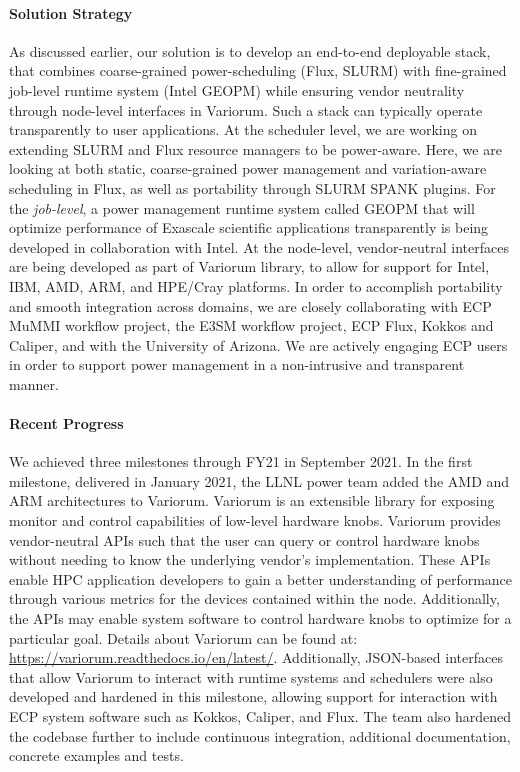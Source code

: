 \paragraph{Solution Strategy}
As discussed earlier, our solution is to develop an end-to-end deployable stack, that combines coarse-grained power-scheduling (Flux, SLURM) with fine-grained job-level runtime system (Intel GEOPM) while ensuring vendor neutrality through node-level interfaces in Variorum. Such a stack can typically operate transparently to user applications. At the scheduler level, we are working on extending SLURM and Flux resource managers to be power-aware. Here, we are looking at both static, coarse-grained power management and variation-aware scheduling in Flux, as well as portability through SLURM SPANK plugins. For the \emph{job-level}, a power management runtime system called GEOPM that will optimize performance of Exascale scientific applications transparently is being developed in collaboration with Intel. At the node-level, vendor-neutral interfaces are being developed as part of Variorum library, to allow for support for Intel, IBM, AMD, ARM, and HPE/Cray platforms. In order to accomplish portability and smooth integration across domains, we are closely collaborating with ECP MuMMI workflow project, the E3SM workflow project, ECP Flux, Kokkos and Caliper, and with the University of Arizona. We are actively engaging ECP users in order to support power management in a non-intrusive and transparent manner. 

\paragraph{Recent Progress}
We achieved three milestones through FY21 in September 2021. In the first milestone, delivered in January 2021, the LLNL power team added the AMD and ARM architectures to Variorum. Variorum is an extensible library for exposing monitor and control capabilities of low-level hardware knobs. Variorum provides vendor-neutral APIs such that the user can query or control hardware knobs without needing to know the underlying vendor’s implementation. These APIs enable HPC application developers to gain a better understanding of performance through various metrics for the devices contained within the node. Additionally, the APIs may enable system software to control hardware knobs to optimize for a particular goal. Details about Variorum can be found at: \url{https://variorum.readthedocs.io/en/latest/}. Additionally, JSON-based interfaces that allow Variorum to interact with runtime systems and schedulers were also developed and hardened in this milestone, allowing support for interaction with ECP system software such as Kokkos, Caliper, and Flux. The team also hardened the codebase further to include continuous integration, additional documentation, concrete examples and tests.


